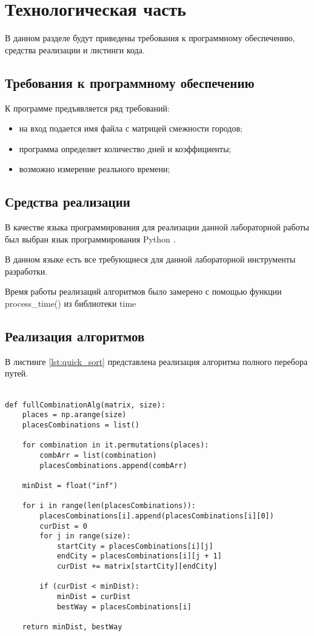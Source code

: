 \chapter{Технологическая часть}

В данном разделе будут приведены требования к программному обеспечению, средства реализации и листинги кода.

\section{Требования к программному обеспечению}

К программе предъявляется ряд требований:

\begin{itemize}[label=--]
	\item на вход подается имя файла с матрицей смежности городов;
	\item программа определяет количество дней и коэффициенты;
	\item возможно измерение реального времени;
\end{itemize}

\section{Средства реализации}

В качестве языка программирования для реализации данной лабораторной работы был выбран язык программирования Python \cite{pythonlang}. 

В данном языке есть все требующиеся для данной лабораторной инструменты разработки. 

Время работы реализаций алгоритмов было замерено с помощью функции process\_time() из библиотеки time \cite{pythonlangtime}

\section{Реализация алгоритмов}
В листинге \ref{lst:quick_sort} представлена реализация алгоритма полного перебора путей.
\\
\\

\begin{lstlisting}[label=lst:quick_sort,caption=Реализация последовательного алгоритма умножения разреженных матриц]
def fullCombinationAlg(matrix, size):
	places = np.arange(size)
	placesCombinations = list()

	for combination in it.permutations(places):
		combArr = list(combination)
		placesCombinations.append(combArr)

	minDist = float("inf")

	for i in range(len(placesCombinations)):
		placesCombinations[i].append(placesCombinations[i][0])
		curDist = 0
		for j in range(size):
			startCity = placesCombinations[i][j]
			endCity = placesCombinations[i][j + 1]
			curDist += matrix[startCity][endCity]

		if (curDist < minDist):
			minDist = curDist
			bestWay = placesCombinations[i]

	return minDist, bestWay
\end{lstlisting}

